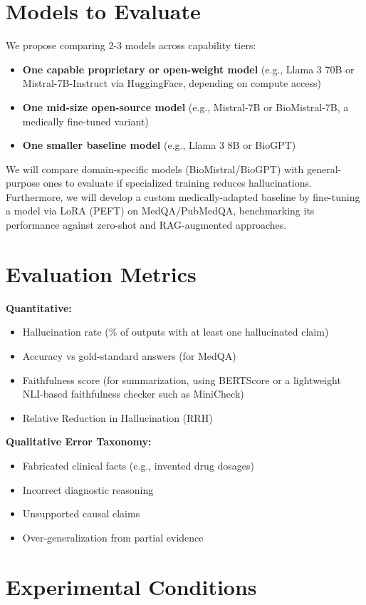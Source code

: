 \documentclass[11pt]{article}
\begin{document}
\section{Models to Evaluate}
We propose comparing 2-3 models across capability tiers:
\begin{itemize}
    \item \textbf{One capable proprietary or open-weight model} (e.g., Llama 3 70B or Mistral-7B-Instruct via HuggingFace, depending on compute access)
    \item \textbf{One mid-size open-source model} (e.g., Mistral-7B or BioMistral-7B, a medically fine-tuned variant)
    \item \textbf{One smaller baseline model} (e.g., Llama 3 8B or BioGPT)
\end{itemize}
We will compare domain-specific models (BioMistral/BioGPT) with general-purpose ones to evaluate if specialized training reduces hallucinations.
Furthermore, we will develop a custom medically-adapted baseline by fine-tuning a model via LoRA (PEFT) on MedQA/PubMedQA, benchmarking its performance against zero-shot and RAG-augmented approaches.
\newpage
\section{Evaluation Metrics}
\textbf{Quantitative:}
\begin{itemize}
    \item Hallucination rate (\% of outputs with at least one hallucinated claim)
    \item Accuracy vs gold-standard answers (for MedQA)
    \item Faithfulness score (for summarization, using BERTScore or a lightweight NLI-based faithfulness checker such as MiniCheck)
    \item Relative Reduction in Hallucination (RRH)
\end{itemize}
\textbf{Qualitative Error Taxonomy:}
\begin{itemize}
    \item Fabricated clinical facts (e.g., invented drug dosages)
    \item Incorrect diagnostic reasoning
    \item Unsupported causal claims
    \item Over-generalization from partial evidence
\end{itemize}

\newpage
\section{Experimental Conditions}
\end{document}
